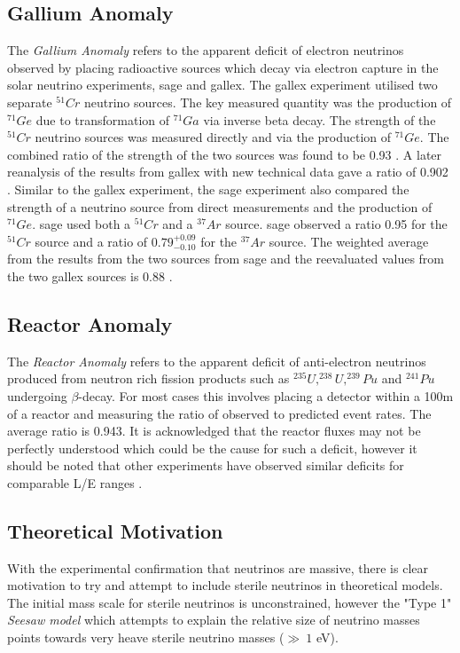 \subsection{Gallium Anomaly}
The \textit{Gallium Anomaly} refers to the apparent deficit of electron neutrinos observed by placing radioactive sources which decay via electron capture in the solar neutrino experiments, \gls{sage} and \gls{gallex}. The \gls{gallex} experiment utilised two separate $^{51}Cr$ neutrino sources. The key measured quantity was the production of $^{71}Ge$ due to transformation of $^{71}Ga$ via inverse beta decay. The strength of the $^{51}Cr$ neutrino sources was measured directly and via the production of $^{71}Ge$. The combined ratio of the strength of the two sources was found to be 0.93 \cite{GALLEX}. A later reanalysis of the results from \gls{gallex} with new technical data gave a ratio of 0.902 \cite{Gallex_reanalysis}. Similar to the \gls{gallex} experiment, the \gls{sage} experiment also compared the strength of a neutrino source from direct measurements and the production of $^{71}Ge$. \gls{sage} used both a $^{51}Cr$ and a $^{37}Ar$ source.  \gls{sage} observed a ratio 0.95 for the $^{51}Cr$ source and a ratio of $0.79^{+0.09}_{-0.10}$ for the $^{37}Ar$ source. The weighted average from the results from the two sources from \gls{sage} and the reevaluated values from the two \gls{gallex} sources is 0.88 \cite{SAGE}.

\subsection{Reactor Anomaly}
The \textit{Reactor Anomaly} refers to the apparent deficit of anti-electron neutrinos produced from neutron rich fission products such as $^{235}U, ^{238}U, ^{239}Pu$ and $^{241}Pu$ undergoing  $\beta$-decay. For most cases this involves placing a detector within a 100m of a reactor and measuring the ratio of observed to predicted event rates. The average ratio is 0.943. It is acknowledged that the reactor fluxes may not be perfectly understood which could be the cause for such a deficit, however it should be noted that other experiments have observed similar deficits for comparable L/E ranges \cite{Reactor_anomaly}. 

\subsection{Theoretical Motivation}
With the experimental confirmation that neutrinos are massive,  there is clear motivation to try and attempt to include sterile neutrinos in theoretical models. The initial mass scale for sterile neutrinos is unconstrained, however the "Type 1" \textit{Seesaw model} which attempts to explain the relative size of neutrino masses points towards very heave sterile neutrino masses ($\gg ~1$ eV).
\cite{White_Paper}


